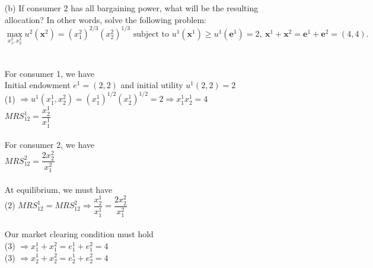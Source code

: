 \documentclass[11pt]{article}
\begin{document}
\begin{enumerate}
\begin{itemize}
	\item[(b)] If consumer 2 has all bargaining power, what will be the resulting allocation? In other words, solve the following problem:
	\begin{equation*}
	\max_{x_{1}^{2},x_{2}^{2}}u^{2}(\mathbf{x}^{2})=(x_{1}^{2})^{2/3}(x_{2}^{2})^{1/3}\text{ subject to }u^{1}(\mathbf{x}^{1})\geq u^{1}(\mathbf{e}^{1})=2,~\mathbf{x}^{1}+\mathbf{x}^{2}=\mathbf{e}^{1}+\mathbf{e}^{2}=(4,4).
	\end{equation*}
	\smallskip\\\\
	For consumer 1, we have\\
	Initial endowment $e^1=(2,2)$ and initial utility $u^1(2,2)=2$\\
	(1) $\Rightarrow u^1(x_1^1,x_2^2)=(x_1^1)^{1/2}(x_2^1)^{1/2}=2\Rightarrow x_1^1x_2^1=4$\\
	$MRS_{12}^1=\dfrac{x_2^1}{x_1^1}$\\\\
	For consumer 2, we have\\
	$MRS_{12}^2=\dfrac{2x_2^2}{x_1^2}$\\\\
	At equilibrium, we must have\\
	(2) $MRS_{12}^1=MRS_{12}^2\Rightarrow\dfrac{x_2^1}{x_1^1}=\dfrac{2x_2^2}{x_1^2}$\\\\
	Our market clearing condition must hold\\
	(3) $\Rightarrow x_1^1+x_1^2=e_1^1+e_1^2=4$\\
	(3) $\Rightarrow x_2^1+x_2^2=e_2^1+e_2^2=4$\\\\
	

\end{itemize}
\end{enumerate}
\end{document}
